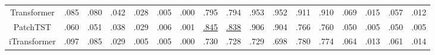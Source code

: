 \begin{table}[t]
{\begin{tabular}{@{} p{0.9cm} p{0.55cm} p{0.55cm} p{0.55cm} p{0.55cm} p{0.55cm} p{0.55cm} p{0.55cm} p{0.55cm} p{0.55cm} p{0.55cm} p{0.55cm} p{0.55cm} p{0.55cm} p{0.52cm} p{0.52cm} p{0.52cm} p{0.52cm} @{}}
\multicolumn{2}{c}{Transformer}  
  & \multicolumn{1}{c}{.085}            
  & \multicolumn{1}{c}{.080}            
  & \multicolumn{1}{c}{.042}            
  & \multicolumn{1}{c}{.028}            
  & \multicolumn{1}{c}{.005}            
  & \multicolumn{1}{c}{.000}            
  & \multicolumn{1}{c}{.795}            
  & \multicolumn{1}{c}{.794}            
  & \multicolumn{1}{c}{.953}            
  & \multicolumn{1}{c}{.952}            
  & \multicolumn{1}{c}{.911}            
  & \multicolumn{1}{c}{.910}            
  & \multicolumn{1}{c}{.069}            
  & \multicolumn{1}{c}{.015}            
  & \multicolumn{1}{c}{.057}            
  & \multicolumn{1}{c}{.012}            
  \\

\multicolumn{2}{c}{PatchTST}  
  & \multicolumn{1}{c}{.060}            
  & \multicolumn{1}{c}{.051}            
  & \multicolumn{1}{c}{.038}            
  & \multicolumn{1}{c}{.029}            
  & \multicolumn{1}{c}{.006}            
  & \multicolumn{1}{c}{.001}            
  & \multicolumn{1}{c}{{\underline{.845}}} %
  & \multicolumn{1}{c}{{\underline{.838}}} %
  & \multicolumn{1}{c}{.906}            
  & \multicolumn{1}{c}{.904}            
  & \multicolumn{1}{c}{.766}            
  & \multicolumn{1}{c}{.760}            
  & \multicolumn{1}{c}{.050}             
  & \multicolumn{1}{c}{.005}            
  & \multicolumn{1}{c}{.050}            
  & \multicolumn{1}{c}{.005}            
  \\

\multicolumn{2}{c}{iTransformer}  
  & \multicolumn{1}{c}{.097}            
  & \multicolumn{1}{c}{.085}            
  & \multicolumn{1}{c}{.029}            
  & \multicolumn{1}{c}{.005}            
  & \multicolumn{1}{c}{.005}            
  & \multicolumn{1}{c}{.000}            
  & \multicolumn{1}{c}{.730}            
  & \multicolumn{1}{c}{.728}            
  & \multicolumn{1}{c}{.729}            
  & \multicolumn{1}{c}{.698}            
  & \multicolumn{1}{c}{.780}            
  & \multicolumn{1}{c}{.774}            
  & \multicolumn{1}{c}{.064}            
  & \multicolumn{1}{c}{.013}            
  & \multicolumn{1}{c}{.061}            
  & \multicolumn{1}{c}{.014}            
  \\


\end{tabular}}
\end{table}
